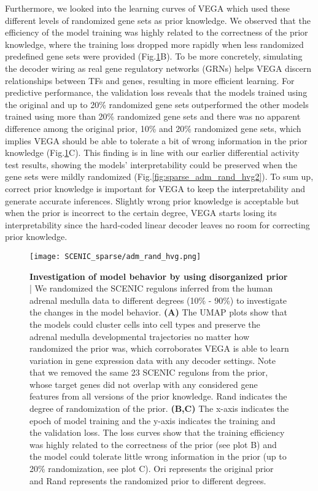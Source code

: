 Furthermore, we looked into the learning curves of VEGA which used these different levels of randomized gene sets as prior knowledge. We observed that the efficiency of the model training was highly related to the correctness of the prior knowledge, where the training loss dropped more rapidly when less randomized predefined gene sets were provided (Fig.\ref{fig:sparse_adm_rand_hvg}B). To be more concretely, simulating the decoder wiring as real gene regulatory networks (GRNs) helps VEGA discern relationships between TFs and genes, resulting in more efficient learning. For predictive performance, the validation loss reveals that the models trained using the original and up to 20\% randomized gene sets outperformed the other models trained using more than 20\% randomized gene sets and there was no apparent difference among the original prior, 10\% and 20\% randomized gene sets, which implies VEGA should be able to tolerate a bit of wrong information in the prior knowledge (Fig.\ref{fig:sparse_adm_rand_hvg}C). This finding is in line with our earlier differential activity test results, showing the models' interpretability could be preserved when the gene sets were mildly randomized (Fig.\ref{fig:sparse_adm_rand_hvg2}). To sum up, correct prior knowledge is important for VEGA to keep the interpretability and generate accurate inferences. Slightly wrong prior knowledge is acceptable but when the prior is incorrect to the certain degree, VEGA starts losing its interpretability since the hard-coded linear decoder leaves no room for correcting prior knowledge\cite{Seninge2021}.

\newpage

\begin{figure}[H]
    \centering
    \texttt{[image: SCENIC\_sparse/adm\_rand\_hvg.png]}
    \caption{\small{\textbf{Investigation of model behavior by using disorganized prior} | We randomized the SCENIC regulons inferred from the human adrenal medulla data to different degrees (10\% - 90\%) to investigate the changes in the model behavior. \textbf{(A)} The UMAP plots show that the models could cluster cells into cell types and preserve the adrenal medulla developmental trajectories no matter how randomized the prior was, which corroborates VEGA is able to learn variation in gene expression data with any decoder settings. Note that we removed the same 23 SCENIC regulons from the prior, whose target genes did not overlap with any considered gene features from all versions of the prior knowledge. Rand indicates the degree of randomization of the prior. \textbf{(B,C)} The x-axis indicates the epoch of model training and the y-axis indicates the training and the validation loss. The loss curves show that the training efficiency was highly related to the correctness of the prior (see plot B) and the model could tolerate little wrong information in the prior (up to 20\% randomization, see plot C). Ori represents the original prior and Rand represents the randomized prior to different degrees.}}
    \label{fig:sparse_adm_rand_hvg}
\end{figure}

